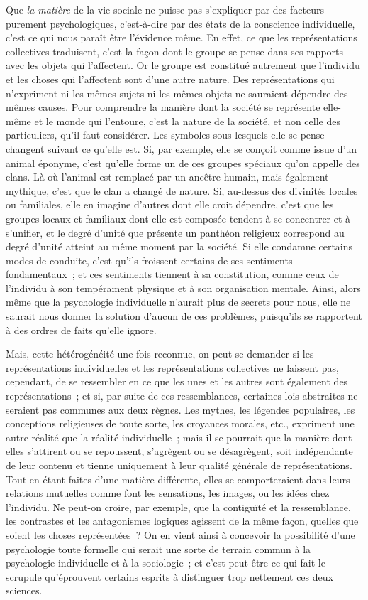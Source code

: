 \documentclass[french,twoside]{book} %
\begin{document}
Que {\itshape la matière} de la vie sociale ne puisse pas s’expliquer par des facteurs purement psychologiques, c’est-à-dire par des états de la conscience individuelle, c’est ce qui nous paraît être l’évidence même. En effet, ce que les représentations collectives traduisent, c’est la façon dont le groupe se pense dans ses rapports avec les objets qui l’affectent. Or le groupe est constitué autrement que l’individu et les choses qui l’affectent sont d’une autre nature. Des représentations qui n’expriment ni les mêmes sujets ni les mêmes objets ne sauraient dépendre des mêmes causes. Pour comprendre la manière dont la société se représente elle-même et le monde qui l’entoure, c’est la nature de la société, et non celle des particuliers, qu’il faut considérer. Les symboles sous lesquels elle se pense changent suivant ce qu’elle est. Si, par exemple, elle se conçoit comme issue d’un animal éponyme, c’est qu’elle forme un de ces groupes spéciaux qu’on appelle des clans. Là où l’animal est remplacé par un ancêtre humain, mais également mythique, c’est que le clan a changé de nature. Si, au-dessus des divinités locales ou familiales, elle en imagine d’autres dont elle croit dépendre, c’est que les groupes locaux et familiaux dont elle est composée tendent à se concentrer et à s’unifier, et le degré d’unité que présente un panthéon religieux correspond au degré d’unité atteint au même moment par la société. Si elle condamne certains modes de conduite, c’est qu’ils froissent certains de ses sentiments fondamentaux ; et ces sentiments tiennent à sa constitution, comme ceux de l’individu à son tempérament physique et à son organisation mentale. Ainsi, alors même que la psychologie individuelle n’aurait plus de secrets pour nous, elle ne saurait nous donner la solution d’aucun de ces problèmes, puisqu’ils se rapportent à des ordres de faits qu’elle ignore.\par
Mais, cette hétérogénéité une fois reconnue, on peut se demander si les représentations individuelles et les représentations collectives ne laissent pas, cependant, de se ressembler en ce que les unes et les autres sont également des représentations ; et si, par suite de ces ressemblances, certaines lois abstraites ne seraient pas communes aux deux règnes. Les mythes, les légendes populaires, les conceptions religieuses de toute sorte, les croyances morales, etc., expriment une autre réalité que la réalité individuelle ; mais il se pourrait que la manière dont elles s’attirent ou se repoussent, s’agrègent ou se désagrègent, soit indépendante de leur contenu et tienne uniquement à leur qualité générale de représentations. Tout en étant faites d’une matière différente, elles se comporteraient dans leurs relations mutuelles comme font les sensations, les images, ou les idées chez l’individu. Ne peut-on croire, par exemple, que la contiguïté et la ressemblance, les contrastes et les antagonismes logiques agissent de la même façon, quelles que soient les choses représentées ? On en vient ainsi à concevoir la possibilité d’une psychologie toute formelle qui serait une sorte de terrain commun à la psychologie individuelle et à la sociologie ; et c’est peut-être ce qui fait le scrupule qu’éprouvent certains esprits à distinguer trop nettement ces deux sciences.\par
\end{document}
